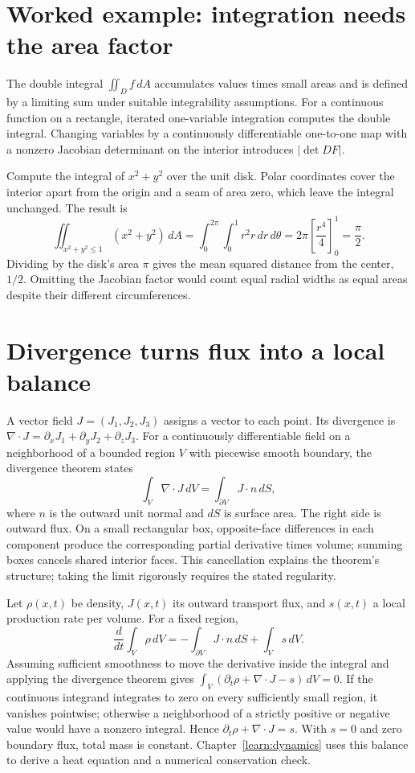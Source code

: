 \section{Worked example: integration needs the area factor}
The double integral $\iint_D f\,dA$ accumulates values times small areas
and is defined by a limiting sum under suitable integrability assumptions.
For a continuous function on a rectangle, iterated one-variable integration
computes the double integral. Changing variables by a continuously
differentiable one-to-one map with a nonzero Jacobian determinant on the
interior introduces $|\det DF|$.

Compute the integral of $x^2+y^2$ over the unit disk. Polar coordinates
cover the interior apart from the origin and a seam of area zero, which
leave the integral unchanged. The result is
\[
 \iint_{x^2+y^2\leq1}(x^2+y^2)\,dA
 =\int_0^{2\pi}\int_0^1r^2r\,dr\,d\theta
 =2\pi\left[\frac{r^4}{4}\right]_0^1=\frac\pi2.
\]
Dividing by the disk's area $\pi$ gives the mean squared distance from
the center, $1/2$. Omitting the Jacobian factor would count equal radial
widths as equal areas despite their different circumferences.

\section{Divergence turns flux into a local balance}
A vector field $J=(J_1,J_2,J_3)$ assigns a vector to each point. Its
divergence is $\nabla\cdot J=\partial_xJ_1+\partial_yJ_2+\partial_zJ_3$.
For a continuously differentiable field on a neighborhood of a bounded region
$V$ with piecewise smooth boundary, the divergence theorem states
\[
 \int_V\nabla\cdot J\,dV=\int_{\partial V}J\cdot n\,dS,
\]
where $n$ is the outward unit normal and $dS$ is surface area. The right
side is outward flux. On a small rectangular box, opposite-face differences
in each component produce the corresponding partial derivative times volume;
summing boxes cancels shared interior faces. This cancellation explains the
theorem's structure; taking the limit rigorously requires the stated regularity.

Let $\rho(x,t)$ be density, $J(x,t)$ its outward transport flux, and
$s(x,t)$ a local production rate per volume. For a fixed region,
\[
 \frac{d}{dt}\int_V\rho\,dV=-\int_{\partial V}J\cdot n\,dS+\int_Vs\,dV.
\]
Assuming sufficient smoothness to move the derivative inside the integral
and applying the divergence theorem gives
$\int_V(\partial_t\rho+\nabla\cdot J-s)\,dV=0$.
If the continuous integrand integrates to zero on every sufficiently small
region, it vanishes pointwise; otherwise a neighborhood of a strictly
positive or negative value would have a nonzero integral. Hence
$\partial_t\rho+\nabla\cdot J=s$. With $s=0$ and zero boundary flux,
total mass is constant. Chapter~\ref{learn:dynamics} uses this balance to
derive a heat equation and a numerical conservation check.


